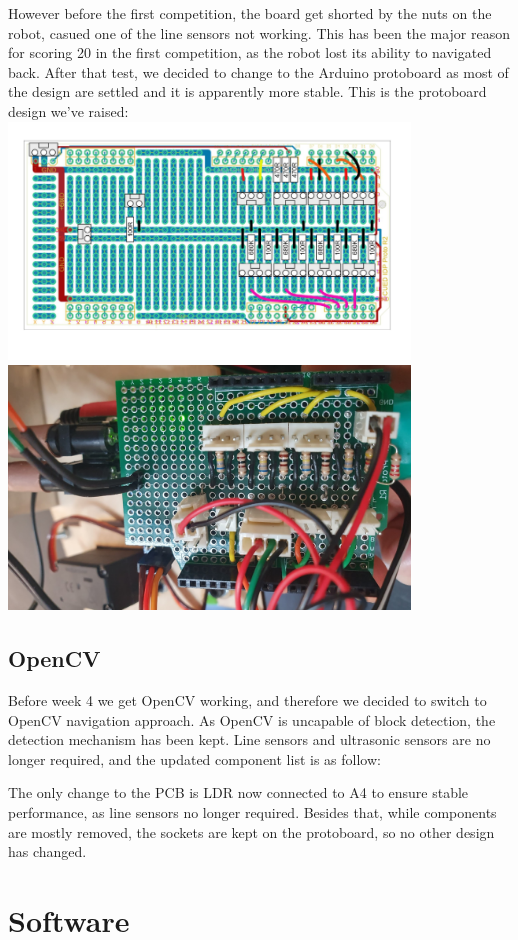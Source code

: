 \documentclass{article}
\begin{document}
However before the first competition, the board get shorted by the nuts on the robot, casued one of the line sensors not working. This has been the major reason for scoring 20 in the first competition, as the robot lost its ability to navigated back.
After that test, we decided to change to the Arduino protoboard as most of the design are settled and it is apparently more stable. This is the protoboard design we’ve raised:
\includegraphics[width=0.8\textwidth]{assets/Proto.png}
\includegraphics[width=0.8\textwidth]{assets/Board.png}
\subsection{OpenCV}
\quad Before week 4 we get OpenCV working, and therefore we decided to switch to OpenCV navigation approach. As OpenCV is uncapable of block detection, the detection mechanism has been kept. Line sensors and ultrasonic sensors are no longer required, and the updated component list is as follow:

The only change to the PCB is LDR now connected to A4 to ensure stable performance, as line sensors no longer required. Besides that, while components are mostly removed, the sockets are kept on the protoboard, so no other design has changed.

\section{Software}
\end{document}
